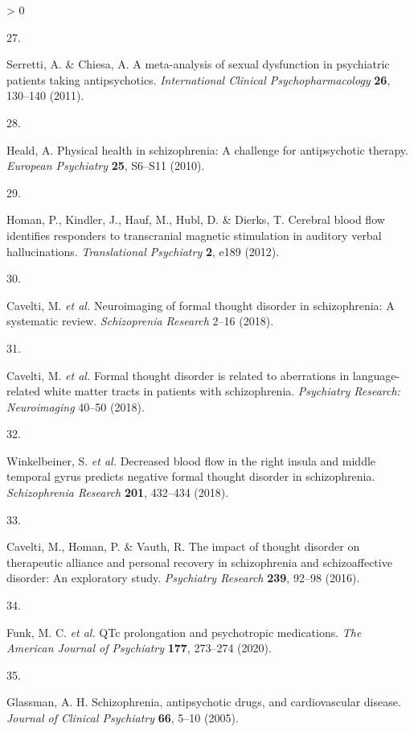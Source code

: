 \documentclass[
  9pt,
  english,
  ,jou,floatsintext]{apa6}
\newlength{\cslhangindent}
\newlength{\csllabelwidth}
\newenvironment{CSLReferences}[2] %
 {%
  \setlength{\parindent}{0pt}
  \ifodd #1 \everypar{\setlength{\hangindent}{\cslhangindent}}\ignorespaces\fi
  \ifnum #2 > 0
  \setlength{\parskip}{#2\baselineskip}
  \fi
 }%
 {}
\newcommand{\CSLLeftMargin}[1]{\parbox[t]{\csllabelwidth}{#1}}
\newcommand{\CSLRightInline}[1]{\parbox[t]{\linewidth - \csllabelwidth}{#1}\break}
\begin{document}
\begin{CSLReferences}{0}{0}
\leavevmode\hypertarget{ref-Serretti2011}{}%
\CSLLeftMargin{27. }
\CSLRightInline{Serretti, A. \& Chiesa, A. A meta-analysis of sexual dysfunction in psychiatric patients taking antipsychotics. \emph{{International Clinical Psychopharmacology}} \textbf{26}, 130--140 (2011).}

\leavevmode\hypertarget{ref-Heald2010}{}%
\CSLLeftMargin{28. }
\CSLRightInline{Heald, A. Physical health in schizophrenia: A challenge for antipsychotic therapy. \emph{European Psychiatry} \textbf{25}, S6--S11 (2010).}

\leavevmode\hypertarget{ref-Homan2012a}{}%
\CSLLeftMargin{29. }
\CSLRightInline{Homan, P., Kindler, J., Hauf, M., Hubl, D. \& Dierks, T. Cerebral blood flow identifies responders to transcranial magnetic stimulation in auditory verbal hallucinations. \emph{Translational Psychiatry} \textbf{2}, e189 (2012).}

\leavevmode\hypertarget{ref-Cavelti2018}{}%
\CSLLeftMargin{30. }
\CSLRightInline{Cavelti, M. \emph{et al.} Neuroimaging of formal thought disorder in schizophrenia: A systematic review. \emph{Schizoprenia Research} 2--16 (2018).}

\leavevmode\hypertarget{ref-Cavelti2018a}{}%
\CSLLeftMargin{31. }
\CSLRightInline{Cavelti, M. \emph{et al.} Formal thought disorder is related to aberrations in language-related white matter tracts in patients with schizophrenia. \emph{Psychiatry Research: Neuroimaging} 40--50 (2018).}

\leavevmode\hypertarget{ref-Winkelbeiner2018a}{}%
\CSLLeftMargin{32. }
\CSLRightInline{Winkelbeiner, S. \emph{et al.} Decreased blood flow in the right insula and middle temporal gyrus predicts negative formal thought disorder in schizophrenia. \emph{Schizophrenia Research} \textbf{201}, 432--434 (2018).}

\leavevmode\hypertarget{ref-Cavelti2016}{}%
\CSLLeftMargin{33. }
\CSLRightInline{Cavelti, M., Homan, P. \& Vauth, R. The impact of thought disorder on therapeutic alliance and personal recovery in schizophrenia and schizoaffective disorder: An exploratory study. \emph{Psychiatry Research} \textbf{239}, 92--98 (2016).}

\leavevmode\hypertarget{ref-Funk2020}{}%
\CSLLeftMargin{34. }
\CSLRightInline{Funk, M. C. \emph{et al.} QTc prolongation and psychotropic medications. \emph{{The American Journal of Psychiatry}} \textbf{177}, 273--274 (2020).}

\leavevmode\hypertarget{ref-Glassman2005}{}%
\CSLLeftMargin{35. }
\CSLRightInline{Glassman, A. H. Schizophrenia, antipsychotic drugs, and cardiovascular disease. \emph{{Journal of Clinical Psychiatry}} \textbf{66}, 5--10 (2005).}


\end{CSLReferences}
\end{document}
